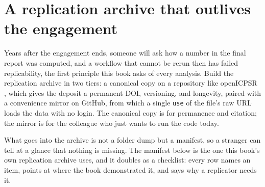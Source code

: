\documentclass[
    a4paper,
    fontsize=10pt,
    twoside=true,
    numbers=noenddot,
]{kaobook}
\begin{document}
\section{A replication archive that outlives the engagement}\label{sec:archive}
Years after the engagement ends, someone will ask how a number in the final report was computed, and a workflow that cannot be rerun then has failed replicability, the first principle this book asks of every analysis. Build the replication archive in two tiers: a canonical copy on a repository like openICPSR \parencite{openicpsr}, which gives the deposit a permanent DOI, versioning, and longevity, paired with a convenience mirror on GitHub, from which a single \texttt{use} of the file's raw URL loads the data with no login. The canonical copy is for permanence and citation; the mirror is for the colleague who just wants to run the code today.

What goes into the archive is not a folder dump but a manifest, so a stranger can tell at a glance that nothing is missing. The manifest below is the one this book's own replication archive uses, and it doubles as a checklist: every row names an item, points at where the book demonstrated it, and says why a replicator needs it.
\end{document}
